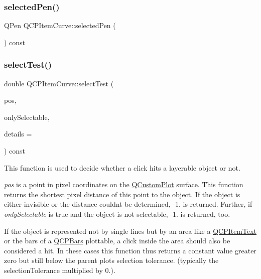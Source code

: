 \subsubsection{\texorpdfstring{selectedPen()}{selectedPen()}}
{\footnotesize\ttfamily Q\+Pen Q\+C\+P\+Item\+Curve\+::selected\+Pen (\begin{DoxyParamCaption}{ }\end{DoxyParamCaption}) const\hspace{0.3cm}{\ttfamily [inline]}}

\mbox{\label{class_q_c_p_item_curve_a718fa40140a43c8afbd41a3d85c92d72}} 
\subsubsection{\texorpdfstring{selectTest()}{selectTest()}}
{\footnotesize\ttfamily double Q\+C\+P\+Item\+Curve\+::select\+Test (\begin{DoxyParamCaption}\item[{const Q\+PointF \&}]{pos,  }\item[{bool}]{only\+Selectable,  }\item[{Q\+Variant $\ast$}]{details = {} }\end{DoxyParamCaption}) const\hspace{0.3cm}{\ttfamily [virtual]}}

This function is used to decide whether a click hits a layerable object or not.

{\itshape pos} is a point in pixel coordinates on the \mbox{\hyperlink{class_q_custom_plot}{Q\+Custom\+Plot}} surface. This function returns the shortest pixel distance of this point to the object. If the object is either invisible or the distance couldn\textquotesingle{}t be determined, -\/1. is returned. Further, if {\itshape only\+Selectable} is true and the object is not selectable, -\/1. is returned, too.

If the object is represented not by single lines but by an area like a \mbox{\hyperlink{class_q_c_p_item_text}{Q\+C\+P\+Item\+Text}} or the bars of a \mbox{\hyperlink{class_q_c_p_bars}{Q\+C\+P\+Bars}} plottable, a click inside the area should also be considered a hit. In these cases this function thus returns a constant value greater zero but still below the parent plot\textquotesingle{}s selection tolerance. (typically the selection\+Tolerance multiplied by 0.).

